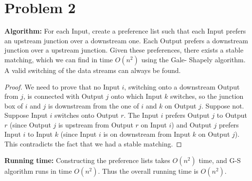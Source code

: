 \documentclass[12pt,letterpaper]{article}
\begin{document}
\section*{Problem 2}

\textbf{Algorithm:} For each Input, create a preference list such that each Input
prefers an upstream junction over a downstream one. Each Output prefers a 
downstream junction over a upstream junction. Given these preferences, there
exists a stable matching, which we can find in time $O(n^2)$ using the Gale-
Shapely algorithm. A valid switching of the data streams can always be found.

\begin{proof}
We need to prove that no Input $i$, switching onto a downstream Output from 
$j$, is connected with Output $j$ onto which Input $k$ switches, so the junction 
box of $i$ and $j$ is downstream from the one of $i$ and $k$ on Output $j$.
Suppose not. Suppose Input $i$ switches onto Output $r$. The Input $i$ prefers Output $j$ to Output $r$ (since Output $j$ is upstream from Output $r$ on 
Input $i$) and Output $j$ prefers Input $i$ to Input $k$ (since Input $i$ is on
downstream from Input $k$ on Output $j$). This contradicts the fact that we 
had a stable matching.
\end{proof}

\textbf{Running time:} Constructing the preference lists takes $O(n^2)$ time,
and G-S algorithm runs in time $O(n^2)$. Thus the overall running time is 
$O(n^2)$.
\end{document}
